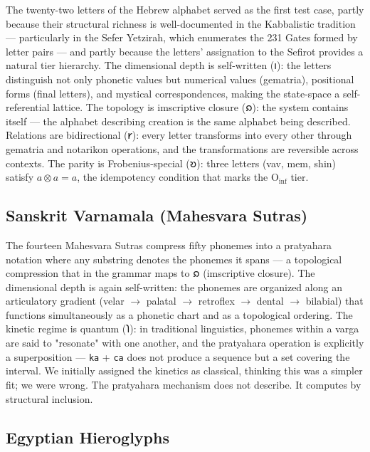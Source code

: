 \documentclass[12pt,a4paper]{article}
\begin{document}
The twenty-two letters of the Hebrew alphabet served as the first test case, partly because their structural richness is well-documented in the Kabbalistic tradition --- particularly in the Sefer Yetzirah, which enumerates the 231 Gates formed by letter pairs --- and partly because the letters' assignation to the Sefirot provides a natural tier hierarchy. The dimensional depth is self-written (𐑦): the letters distinguish not only phonetic values but numerical values (gematria), positional forms (final letters), and mystical correspondences, making the state-space a self-referential lattice. The topology is imscriptive closure (𐑸): the system contains itself --- the alphabet describing creation is the same alphabet being described. Relations are bidirectional (𐑾): every letter transforms into every other through gematria and notarikon operations, and the transformations are reversible across contexts. The parity is Frobenius-special (𐑹): three letters (vav, mem, shin) satisfy $a \otimes a = a$, the idempotency condition that marks the $\text{O}_\text{inf}$ tier.

\subsection{Sanskrit Varnamala (Mahesvara Sutras)}

The fourteen Mahesvara Sutras compress fifty phonemes into a pratyahara notation where any substring denotes the phonemes it spans --- a topological compression that in the grammar maps to $\text{𐑸}$ (imscriptive closure). The dimensional depth is again self-written: the phonemes are organized along an articulatory gradient (velar $\rightarrow$ palatal $\rightarrow$ retroflex $\rightarrow$ dental $\rightarrow$ bilabial) that functions simultaneously as a phonetic chart and as a topological ordering. The kinetic regime is quantum ($\text{𐑐}$): in traditional linguistics, phonemes within a varga are said to "resonate" with one another, and the pratyahara operation is explicitly a superposition --- \texttt{ka} + \texttt{ca} does not produce a sequence but a set covering the interval. We initially assigned the kinetics as classical, thinking this was a simpler fit; we were wrong. The pratyahara mechanism does not describe. It computes by structural inclusion.

\subsection{Egyptian Hieroglyphs}
\end{document}
